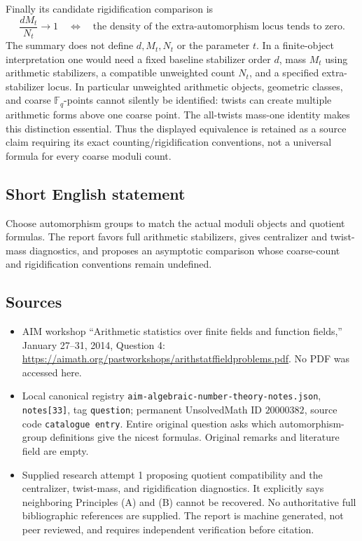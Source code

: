 \documentclass[11pt]{article}
\newcommand{\F}{\mathbb{F}}
\begin{document}
Finally its candidate rigidification comparison is
\[
\frac{dM_t}{N_t}\longrightarrow1
\quad\Longleftrightarrow\quad
\text{the density of the extra-automorphism locus tends to zero}.
\]
The summary does not define \(d,M_t,N_t\) or the parameter \(t\). In a finite-object interpretation one would need a fixed baseline stabilizer order \(d\), mass \(M_t\) using arithmetic stabilizers, a compatible unweighted count \(N_t\), and a specified extra-stabilizer locus. In particular unweighted arithmetic objects, geometric classes, and coarse \(\F_q\)-points cannot silently be identified: twists can create multiple arithmetic forms above one coarse point. The all-twists mass-one identity makes this distinction essential. Thus the displayed equivalence is retained as a source claim requiring its exact counting/rigidification conventions, not a universal formula for every coarse moduli count.
\subsection{Short English statement}
Choose automorphism groups to match the actual moduli objects and quotient formulas. The report favors full arithmetic stabilizers, gives centralizer and twist-mass diagnostics, and proposes an asymptotic comparison whose coarse-count and rigidification conventions remain undefined.
\subsection{Sources}
\begin{itemize}
\item AIM workshop ``Arithmetic statistics over finite fields and function fields,'' January 27--31, 2014, Question 4: \url{https://aimath.org/pastworkshops/arithstatffieldproblems.pdf}. No PDF was accessed here.
\item Local canonical registry \texttt{aim-algebraic-number-theory-notes.json}, \texttt{notes[33]}, tag \texttt{question}; permanent UnsolvedMath ID \(20000382\), source code \texttt{catalogue entry}. Entire original question asks which automorphism-group definitions give the nicest formulas. Original remarks and literature field are empty.
\item Supplied research attempt 1 proposing quotient compatibility and the centralizer, twist-mass, and rigidification diagnostics. It explicitly says neighboring Principles (A) and (B) cannot be recovered. No authoritative full bibliographic references are supplied. The report is machine generated, not peer reviewed, and requires independent verification before citation.
\end{itemize}
\end{document}
